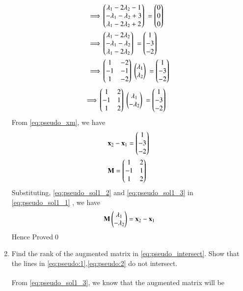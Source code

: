 \documentclass[journal,12pt,twocolumn]{IEEEtran}
\renewcommand\thesection{\arabic{section}}
\begin{document}
\begin{enumerate}[label=\thesection.\arabic*.,ref=\thesection.\theenumi]
\begin{align*}
\implies & \myvec{\lambda_1-2\lambda_2-1\\-\lambda_1-\lambda_2+3\\\lambda_1-2\lambda_2+2}\ = \myvec{0\\0\\0}\ \\
\implies & \myvec{\lambda_1-2\lambda_2\\ -\lambda_1-\lambda_2\\\lambda_1-2\lambda_2}\ = \myvec{1\\-3\\-2}\ \\
\implies & \myvec{1 & -2\\ -1 & -1\\ 1 & -2}\ \myvec{\lambda_1\\ \lambda_2}\ = \myvec{1\\-3\\-2}\ \\
\end{align*}
\begin{align}
\implies & \myvec{1 & 2\\ -1 & 1\\ 1 & 2}\ \myvec{\lambda_1\\ -\lambda_2}\ = \myvec{1\\-3\\-2}\ \label{eq:pseudo_sol1_1} 
\end{align}
From \eqref{eq:pseudo_xm}, we have 
\begin{align}
& \vec{x}_2-\vec{x}_1= \myvec{1\\-3\\-2}\ \label{eq:pseudo_sol1_2} \\
& \vec{M}=\myvec{1 & 2\\ -1 & 1\\ 1 & 2}\ \label{eq:pseudo_sol1_3}
\end{align}
Substituting, \eqref{eq:pseudo_sol1_2} and \eqref{eq:pseudo_sol1_3} in \eqref{eq:pseudo_sol1_1} , we have 
\begin{align}
\mathbf{M}\begin{pmatrix}\lambda_1 \\ -\lambda_2\end{pmatrix} = \mathbf{x}_2 - \mathbf{x}_1 \label{eq:pseudo_sol1_4}
\end{align}
Hence Proved\qed
\item Find the rank of the augmented matrix in 
\eqref{eq:pseudo_intersect}.
	Show that  the lines in \eqref{eq:pseudo:1},\eqref{eq:pseudo:2}
 do not intersect.\\
\solution\\
From \eqref{eq:pseudo_sol1_3}, we know that the augmented matrix will be

\end{enumerate}
\end{document}
